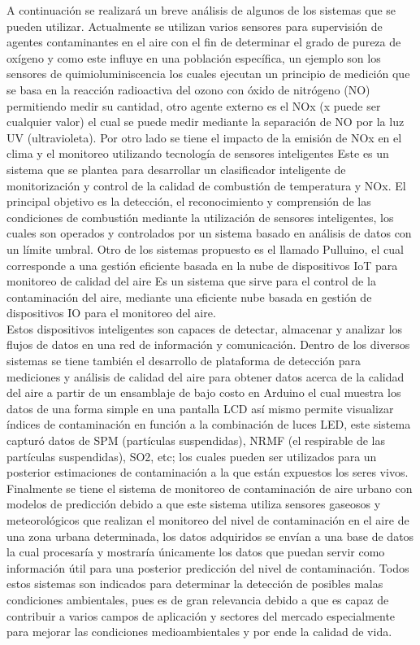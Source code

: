 \documentclass[10pt,a4paper]{article}
\begin{document}
A continuación se realizará un breve análisis de algunos de los sistemas que se pueden utilizar. Actualmente se utilizan varios sensores para supervisión de agentes contaminantes en el aire con el fin de determinar el grado de pureza de oxígeno y como este influye en una población específica, un ejemplo son los sensores de quimioluminiscencia los cuales ejecutan un principio de medición que se basa en la reacción radioactiva del ozono con óxido de nitrógeno (NO) permitiendo medir su cantidad, otro agente externo es el NOx (x puede ser cualquier valor) el cual se puede medir mediante la separación de NO por la luz UV (ultravioleta). Por otro lado se tiene el impacto de la emisión de NOx en el clima y el monitoreo utilizando tecnología de sensores inteligentes Este es un sistema que se plantea para desarrollar un clasificador inteligente de monitorización y control de la calidad de combustión de temperatura y NOx. El principal objetivo es la detección, el reconocimiento y comprensión de las condiciones de combustión mediante la utilización de sensores inteligentes, los cuales son operados y controlados por un sistema basado en análisis de datos con un límite umbral. Otro de los sistemas propuesto es el llamado Pulluino, el cual corresponde a una gestión eficiente basada en la nube de dispositivos IoT para monitoreo de calidad del aire Es un sistema que sirve para el control de la contaminación del aire, mediante una eficiente nube basada en gestión de dispositivos IO para el monitoreo del aire.\\
Estos dispositivos inteligentes son capaces de detectar, almacenar y analizar los flujos de datos en una red de información y comunicación. Dentro de los diversos sistemas se tiene también el desarrollo de plataforma de detección para mediciones y análisis de calidad del aire para obtener datos acerca de la calidad del aire a partir de un ensamblaje de bajo costo en Arduino el cual muestra los datos de una forma simple en una pantalla LCD así mismo permite visualizar índices de contaminación en función a la combinación de luces LED, este sistema capturó datos de SPM (partículas suspendidas), NRMF (el respirable de las partículas suspendidas), SO2, etc; los cuales pueden ser utilizados para un posterior estimaciones de contaminación a la que están expuestos los seres vivos. Finalmente se tiene el sistema de monitoreo de contaminación de aire urbano con modelos de predicción debido a que este sistema utiliza sensores gaseosos y meteorológicos que realizan el monitoreo del nivel de contaminación en el aire de una zona urbana determinada, los datos adquiridos se envían a una base de datos la cual procesaría y mostraría únicamente los datos que puedan servir como información útil para una posterior predicción del nivel de contaminación. Todos estos sistemas son indicados para determinar la detección de posibles malas condiciones ambientales, pues es de gran relevancia debido a que es capaz de contribuir a varios campos de aplicación y sectores del mercado especialmente para mejorar las condiciones medioambientales y por ende la calidad de vida.
\end{document}
